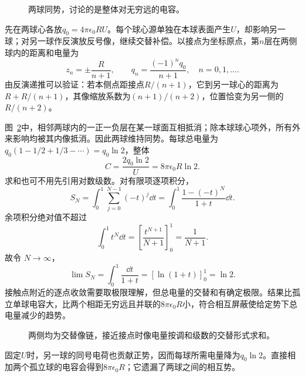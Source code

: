 \begin{figure}[H]\centering
{}
\caption{两球同势，讨论的是整体对无穷远的电容。}\label{fig:es3-e5-q}
\end{figure}
\begin{solution}
先在两球心各放$q_0=4\pi\epsilon_0RU$。每个球心源单独在本球表面产生$U$，却影响另一球；对另一球作反演放反号像，继续交替补偿。以接点为坐标原点，第$n$层在两侧球内的距离和电量为
\[z_n=\pm\frac R{n+1},\qquad q_n=\frac{(-1)^nq_0}{n+1},\quad n=0,1,\ldots.
\]
由反演递推可以验证：若本侧点距接点$R/(n+1)$，它到另一球心的距离为$R+R/(n+1)$，其像缩放系数为$(n+1)/(n+2)$，位置恰变为另一侧的$R/(n+2)$。

图~\ref{fig:es3-e5-s}中，相邻两球内的一正一负层在某一球面互相抵消；除本球球心项外，所有外来影响均被其内像抵消。因此两球维持同势。每球总电量为$q_0(1-1/2+1/3-\cdots)=q_0\ln2$，整体
\[\boxed{C=\frac{2q_0\ln2}{U}=8\pi\epsilon_0R\ln2}.
\]
求和也可不用先引用对数级数。对有限项逐项积分，
\[S_N=\int_0^1\sum_{j=0}^{N-1}(-t)^j\dd t
=\int_0^1\frac{1-(-t)^N}{1+t}\dd t.
\]
余项积分绝对值不超过
\[\int_0^1t^N\dd t=\left[\frac{t^{N+1}}{N+1}\right]_0^1=\frac1{N+1}.\]
故令 $N\to\infty$，
\[\lim S_N=\int_0^1\frac{\dd t}{1+t}
=[\ln(1+t)]_0^1=\ln2.
\]接触点附近的逐点收敛需要取极限理解，但总电量的交替和有确定极限。结果比孤立单球电容大，比两个相距无穷远且并联的$8\pi\epsilon_0R$小，符合相互屏蔽使给定势下总电量减少的趋势。
\begin{figure}[H]\centering
{}
\caption{两侧均为交替像链，接近接点时像电量按调和级数的交替形式求和。}\label{fig:es3-e5-s}
\end{figure}


固定$U$时，另一球的同号电荷也贡献正势，因而每球所需电量降为$q_0\ln2$。直接相加两个孤立球的电容会得到$8\pi\epsilon_0R$；它遗漏了两球之间的相互势。
\end{solution}

